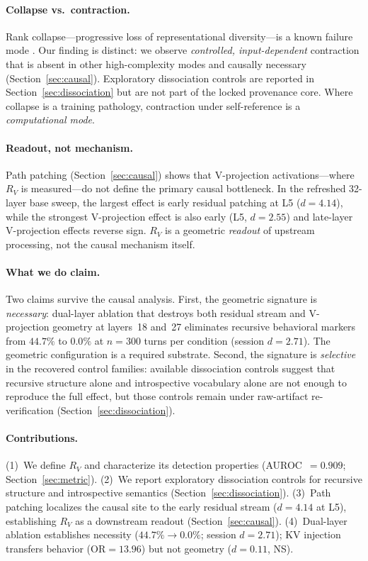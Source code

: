 \documentclass{article}
\newcommand{\RV}{R_V}
\newcommand{\dcohen}{d}
\begin{document}
\paragraph{Collapse vs.\ contraction.}
Rank collapse---progressive loss of representational diversity---is a known failure mode
\citep{noci2022signal, dong2021attention, hong2024variance, giorlandino2025two}.
Our finding is distinct: we observe \emph{controlled, input-dependent} contraction that is
absent in other high-complexity modes and causally necessary (Section~\ref{sec:causal}).
Exploratory dissociation controls are reported in Section~\ref{sec:dissociation} but are not part
of the locked provenance core.
Where collapse is a training pathology, contraction under self-reference is a
\emph{computational mode}.

\paragraph{Readout, not mechanism.}
Path patching (Section~\ref{sec:causal}) shows that V-projection activations---where
$\RV$ is measured---do not define the primary causal bottleneck.
In the refreshed 32-layer base sweep, the largest effect is early residual patching at L5
($\dcohen = 4.14$), while the strongest V-projection effect is also early (L5, $\dcohen = 2.55$)
and late-layer V-projection effects reverse sign.
$\RV$ is a geometric \emph{readout} of upstream processing, not the causal mechanism itself.

\paragraph{What we do claim.}
Two claims survive the causal analysis.
First, the geometric signature is \emph{necessary}: dual-layer ablation that destroys both residual
stream and V-projection geometry at layers~18 and~27 eliminates recursive behavioral markers
from $44.7\%$ to $0.0\%$ at $n{=}300$ turns per condition (session $\dcohen = 2.71$).
The geometric configuration is a required substrate.
Second, the signature is \emph{selective} in the recovered control families: available dissociation
controls suggest that recursive structure alone and introspective vocabulary alone are not enough to
reproduce the full effect, but those controls remain under raw-artifact re-verification
(Section~\ref{sec:dissociation}).

\paragraph{Contributions.}
(1)~We define $\RV$ and characterize its detection properties (AUROC~$= 0.909$;
Section~\ref{sec:metric}).
(2)~We report exploratory dissociation controls for recursive structure and introspective semantics
(Section~\ref{sec:dissociation}).
(3)~Path patching localizes the causal site to the early residual stream ($\dcohen = 4.14$ at L5),
establishing $\RV$ as a downstream readout (Section~\ref{sec:causal}).
(4)~Dual-layer ablation establishes necessity ($44.7\% \to 0.0\%$; session $\dcohen = 2.71$);
KV injection transfers behavior (OR${}=13.96$) but not geometry
($\dcohen = 0.11$, NS).
\end{document}
